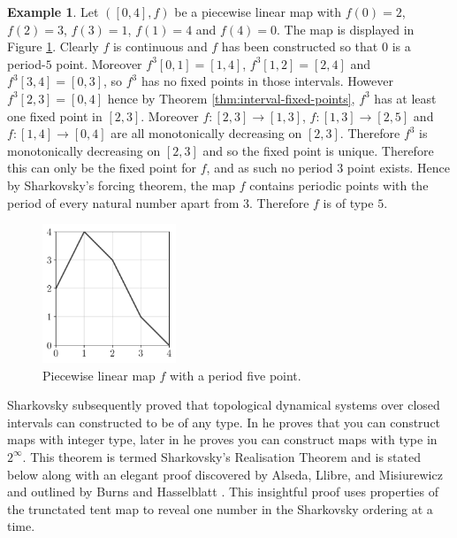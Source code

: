 \documentclass[11pt,a4paper,oneside]{memoir}
\theoremstyle{plain}
\theoremstyle{definition}
\newtheorem{exmp}[thm]{Example}
\begin{document}
\begin{exmp} \label{exmp:piecewise-sharkovsky}
    Let $([0, 4], f)$ be a piecewise linear map with $f(0) = 2$, $f(2) = 3$, $f(3) = 1$, $f(1) = 4$ and $f(4) = 0$. The map is displayed in Figure \ref{fig:piecewise_linear}. Clearly $f$ is continuous and $f$ has been constructed so that $0$ is a period-$5$ point. Moreover $f^3[0, 1] = [1, 4]$, $f^3[1, 2] = [2, 4]$ and $f^3[3, 4] = [0, 3]$, so $f^3$ has no fixed points in those intervals. However $f^3[2, 3] = [0, 4]$ hence by Theorem \ref{thm:interval-fixed-points}, $f^3$ has at least one fixed point in $[2, 3]$. Moreover $f: [2, 3] \to [1, 3]$, $f: [1, 3] \to [2, 5]$ and $f: [1, 4] \to [0, 4]$ are all monotonically decreasing on $[2, 3]$. Therefore $f^3$ is monotonically decreasing on $[2, 3]$ and so the fixed point is unique. Therefore this can only be the fixed point for $f$, and as such no period 3 point exists. Hence by Sharkovsky's forcing theorem, the map $f$ contains periodic points with the period of every natural number apart from 3. Therefore $f$ is of type $5$.

    \begin{figure}[h]
        \centering
        \includegraphics[width=4cm]{piecewise}
        \caption{Piecewise linear map $f$ with a period five point.}
        \label{fig:piecewise_linear}
    \end{figure}

\end{exmp}

Sharkovsky subsequently proved that topological dynamical systems over closed intervals can constructed to be of any type. In \cite{sharkovsky} he proves that you can construct maps with integer type, later in \cite{sharkovsky2} he proves you can construct maps with type in $2^\infty$. This theorem is termed Sharkovsky's Realisation Theorem and is stated below along with an elegant proof discovered by Alseda, Llibre, and Misiurewicz \cite[Section 2.2]{alm} and outlined by Burns and Hasselblatt \cite[Section 7]{burns-hasselblatt}. This insightful proof uses properties of the trunctated tent map to reveal one number in the Sharkovsky ordering at a time.
\end{document}
